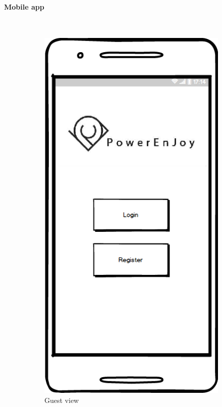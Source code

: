 	\paragraph{Mobile app}\mbox{}\\
	
	\begin{figure}[h]
 
		\begin{subfigure}{0.5\textwidth}
			\includegraphics[scale=0.35]{img/mockups/App_guest.png}
			\caption{Guest view}
			\label{fig:subim1}
		\end{subfigure}
		\begin{subfigure}{0.5\textwidth}

\end{subfigure}
\end{figure}
